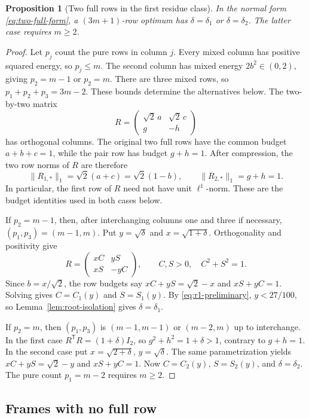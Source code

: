 \documentclass[11pt]{article}
\numberwithin{equation}{section}
\newtheorem{proposition}[proposition]{Proposition}
\theoremstyle{definition}
\theoremstyle{definition}
\newcommand{\norm}[1]{\lVert#1\rVert}
\begin{document}
\begin{proposition}[Two full rows in the first residue class]
\label{prop:r1-two-full}
In the normal form \eqref{eq:two-full-form}, a $(3m+1)$-row optimum has
$\delta=\delta_1$ or $\delta=\delta_2$.  The latter case requires $m\ge2$.
\end{proposition}
\begin{proof}
Let $p_j$ count the pure rows in column $j$. Every mixed column
has positive squared energy, so $p_j\le m$. The second column has
mixed energy $2b^2\in(0,2)$, giving $p_2=m-1$ or $p_2=m$.
There are three mixed rows, so $p_1+p_2+p_3=3m-2$.
These bounds determine the alternatives below.
The two-by-two matrix
\[
 R=\begin{pmatrix}\sqrt2\,a&\sqrt2\,c\\g&-h\end{pmatrix}
\]
has orthogonal columns. The original two full rows have the common
budget $a+b+c=1$, while the pair row has budget $g+h=1$.
After compression, the two row norms of $R$ are therefore
\[
 \norm{R_{1,*}}_1=\sqrt2(a+c)=\sqrt2(1-b),\qquad
 \norm{R_{2,*}}_1=g+h=1.
\]
In particular, the first row of $R$ need not have unit $\ell^1$-norm.
These are the budget identities used in both cases below.

If $p_2=m-1$, then, after interchanging columns one and three if
necessary, $(p_1,p_3)=(m-1,m)$.  Put $y=\sqrt\delta$ and
$x=\sqrt{1+\delta}$.  Orthogonality and positivity give
\[
 R=\begin{pmatrix}xC&yS\\xS&-yC\end{pmatrix},\qquad C,S>0,\quad C^2+S^2=1.
\]
Since $b=x/\sqrt2$, the row budgets say
$xC+yS=\sqrt2-x$ and $xS+yC=1$.  Solving gives
$C=C_1(y)$ and $S=S_1(y)$.  By \eqref{eq:r1-preliminary},
$y<27/100$, so Lemma~\ref{lem:root-isolation} gives $\delta=\delta_1$.

If $p_2=m$, then $(p_1,p_3)$ is $(m-1,m-1)$ or $(m-2,m)$ up to
interchange.  In the first case $R^{\mathsf T}R=(1+\delta)I_2$,
so $g^2+h^2=1+\delta>1$, contrary to $g+h=1$.
In the second case put $x=\sqrt{2+\delta}$, $y=\sqrt\delta$.
The same parametrization yields
$xC+yS=\sqrt2-y$ and $xS+yC=1$.
Now $C=C_2(y)$, $S=S_2(y)$, and $\delta=\delta_2$.
The pure count $p_1=m-2$ requires $m\ge2$.
\end{proof}

\subsection{Frames with no full row}
\end{document}

